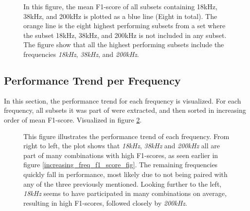         \begin{figure}[H]
            \centering
            
            \caption[With and without unique subset]{In this figure, the mean F1-score of all subsets containing 18kHz, 38kHz, and 200kHz is plotted as a blue line (Eight in total). The orange line is the eight highest performing subsets from a set where the subset 18kHz, 38kHz, and 200kHz is not included in any subset. The figure show that all the highest performing subsets include the frequencies \textit{18kHz}, \textit{38kHz}, and \textit{200kHz}.}
          	\medskip 
            \label{with_without_figure}
        \end{figure}
        
        
    \subsection{Performance Trend per Frequency}
        In this section, the performance trend for each frequency is visualized. For each frequency, all subsets it was part of were extracted, and then sorted in increasing order of mean F1-score. Visualized in figure \ref{performance_trend_fig}.
        
        \begin{figure}[H]
            \centering
            
            \caption[Performance trend per frequency]{This figure illustrates the performance trend of each frequency. From right to left, the plot shows that \textit{18kHz}, \textit{38kHz} and \textit{200kHz} all are part of many combinations with high F1-scores, as seen earlier in figure \ref{increasing_freq_f1_score_fig}. The remaining frequencies quickly fall in performance, most likely due to not being paired with any of the three previously mentioned. Looking further to the left, \textit{18kHz} seems to have participated in many combinations on average, resulting in high F1-scores, followed closely by \textit{200kHz}.}
          	\medskip 
            \label{performance_trend_fig}
        \end{figure}
        
        
    

    
    
